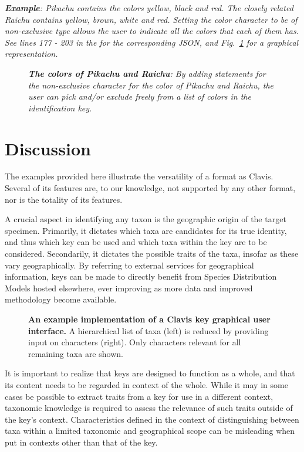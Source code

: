 \documentclass[10pt,letterpaper]{article}
\begin{document}
\textit{\textbf{Example}: Pikachu contains the colors yellow, black and red. The closely related Raichu contains yellow, brown, white and red. Setting the color character to be of non-exclusive type allows the user to indicate all the colors that each of them has. See lines 177 - 203 in the  for the corresponding JSON, and Fig.~\ref{fig4} for a graphical representation.}


\begin{figure}[!h]
  \caption{\textit{\textbf{The colors of Pikachu and Raichu}:
By adding statements for the non-exclusive character for the color of Pikachu and Raichu, the user can pick and/or exclude freely from a list of colors in the identification key.
}}
 \label{fig4}
\end{figure}

\section*{
Discussion
}
The examples provided here illustrate the versatility of a format as Clavis. Several of its features are, to our knowledge, not supported by any other format, nor is the totality of its features.

A crucial aspect in identifying any taxon is the geographic origin of the target specimen. Primarily, it dictates which taxa are candidates for its true identity, and thus which key can be used and which taxa within the key are to be considered. Secondarily, it dictates the possible traits of the taxa, insofar as these vary geographically. By referring to external services for geographical information, keys can be made to directly benefit from Species Distribution Models hosted elsewhere, ever improving as more data and improved methodology become available.


\begin{figure}[!h]
  \caption{{\bf An example implementation of a Clavis key graphical user interface.}
A hierarchical list of taxa (left) is reduced by providing input on characters (right). Only characters relevant for all remaining taxa are shown.
}
  \label{fig5}
\end{figure}

It is important to realize that keys are designed to function as a whole, and that its content needs to be regarded in context of the whole. While it may in some cases be possible to extract traits from a key for use in a different context, taxonomic knowledge is required to assess the relevance of such traits outside of the key's context. Characteristics defined in the context of distinguishing between taxa within a limited taxonomic and geographical scope can be misleading when put in contexts other than that of the key.
\end{document}
